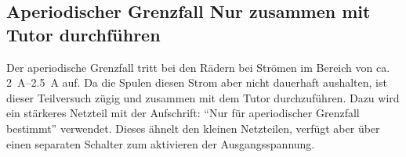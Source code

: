 \documentclass[ngerman,a4paper,11pt]{article}
\begin{document}
\subsection*{Aperiodischer Grenzfall \textemdash{} Nur zusammen mit Tutor durchführen}
Der aperiodische Grenzfall tritt bei den Rädern bei Strömen im Bereich von ca. \SIrange{2}{2.5}{\ampere} auf. Da die Spulen diesen Strom aber nicht dauerhaft aushalten, ist dieser Teilversuch zügig und zusammen mit dem Tutor durchzuführen. Dazu wird ein stärkeres Netzteil mit der Aufschrift: \enquote{Nur für aperiodischer Grenzfall bestimmt} verwendet. Dieses ähnelt den kleinen Netzteilen, verfügt aber über einen separaten Schalter zum aktivieren der Ausgangsspannung.
\end{document}
